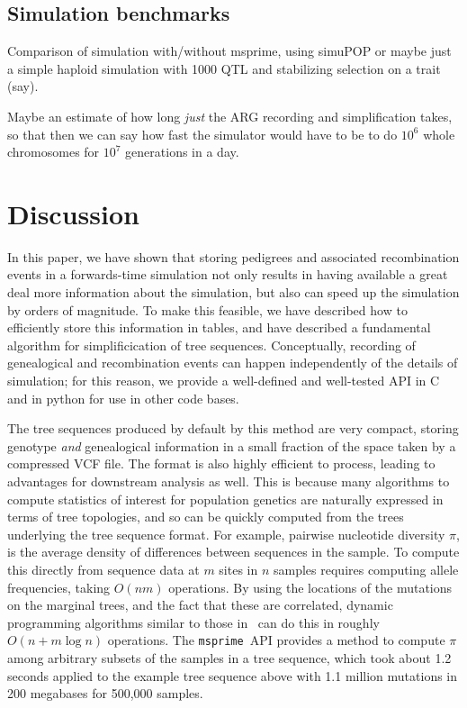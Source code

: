 \documentclass{article}
\newcommand{\msprime}{\texttt{msprime}}
\begin{document}
\subsection*{Simulation benchmarks}

Comparison of simulation with/without msprime, using simuPOP
or maybe just a simple haploid simulation with 1000 QTL and stabilizing selection on a trait (say).

Maybe an estimate of how long \emph{just} the ARG recording and simplification takes,
so that then we can say how fast the simulator would have to be to do $10^6$ whole chromosomes for $10^7$ generations
in a day.


\section*{Discussion}

In this paper, we have shown that storing pedigrees
and associated recombination events
in a forwards-time simulation
not only results in having available a great deal more information about the simulation,
but also can speed up the simulation by orders of magnitude.
To make this feasible, 
we have described how to efficiently store this information in tables,
and have described a fundamental algorithm for simplificication of tree sequences.
Conceptually, recording of genealogical and recombination events
can happen independently of the details of simulation;
for this reason, we provide a well-defined and well-tested API in C and in python
for use in other code bases.

The tree sequences produced by default by this method
are very compact, storing genotype \emph{and} genealogical information
in a small fraction of the space taken by a compressed VCF file.
The format is also highly efficient to process,
leading to advantages for downstream analysis as well.
This is because many algorithms to compute statistics of interest for population genetics
are naturally expressed in terms of tree topologies,
and so can be quickly computed from the trees underlying the tree sequence format. 
For example, pairwise nucleotide diversity $\pi$, is the average density of
differences between sequences in the sample. 
To compute this directly from sequence data at $m$ sites in $n$ samples
requires computing allele frequencies, taking $O(nm)$ operations.
By using the locations of the mutations on the marginal trees,
and the fact that these are correlated, 
dynamic programming algorithms similar to those in~\citep{kelleher2016efficient}
can do this in roughly $O(n + m \log n)$ operations.
The \msprime\ API provides a method to compute $\pi$ among arbitrary subsets of the
samples in a tree sequence, which took about 1.2 seconds
applied to the example tree sequence above with 1.1 million mutations 
in 200 megabases for 500,000 samples.
\end{document}
